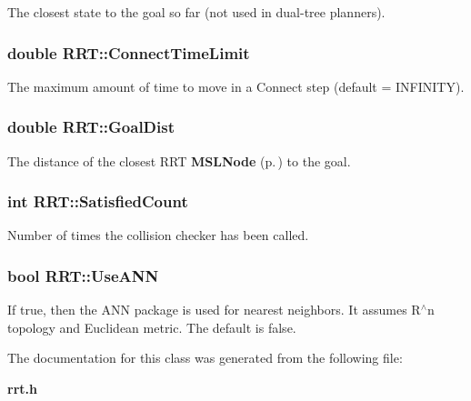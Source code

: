 The closest state to the goal so far (not used in dual-tree planners).

\subsubsection{\setlength{\rightskip}{0pt plus 5cm}double RRT::Connect\-Time\-Limit}\label{class_RRT_m3}


The maximum amount of time to move in a Connect step (default = INFINITY).

\subsubsection{\setlength{\rightskip}{0pt plus 5cm}double RRT::Goal\-Dist}\label{class_RRT_m1}


The distance of the closest RRT {\bf MSLNode} {\rm (p.\,\pageref{class_MSLNode})} to the goal.

\subsubsection{\setlength{\rightskip}{0pt plus 5cm}int RRT::Satisfied\-Count}\label{class_RRT_m4}


Number of times the collision checker has been called.

\subsubsection{\setlength{\rightskip}{0pt plus 5cm}bool RRT::Use\-ANN}\label{class_RRT_m0}


If true, then the ANN package is used for nearest neighbors. It assumes R$^\wedge$n topology and Euclidean metric. The default is false.



The documentation for this class was generated from the following file:\begin{CompactItemize}
\item 
{\bf rrt.h}\end{CompactItemize}

